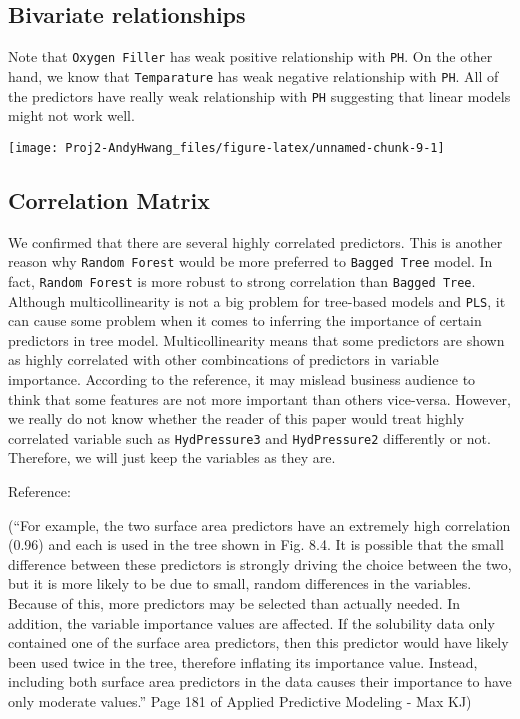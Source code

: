 \documentclass[]{report}
\begin{document}
\subsection{Bivariate relationships}\label{bivariate-relationships}

Note that \texttt{Oxygen\ Filler} has weak positive relationship with
\texttt{PH}. On the other hand, we know that \texttt{Temparature} has
weak negative relationship with \texttt{PH}. All of the predictors have
really weak relationship with \texttt{PH} suggesting that linear models
might not work well.

\begin{center}\texttt{[image: Proj2-AndyHwang\_files/figure-latex/unnamed-chunk-9-1]} \end{center}

\subsection{Correlation Matrix}\label{correlation-matrix}

We confirmed that there are several highly correlated predictors. This
is another reason why \texttt{Random\ Forest} would be more preferred to
\texttt{Bagged\ Tree} model. In fact, \texttt{Random\ Forest} is more
robust to strong correlation than \texttt{Bagged\ Tree}. Although
multicollinearity is not a big problem for tree-based models and
\texttt{PLS}, it can cause some problem when it comes to inferring the
importance of certain predictors in tree model. Multicollinearity means
that some predictors are shown as highly correlated with other
combincations of predictors in variable importance. According to the
reference, it may mislead business audience to think that some features
are not more important than others vice-versa. However, we really do not
know whether the reader of this paper would treat highly correlated
variable such as \texttt{HydPressure3} and \texttt{HydPressure2}
differently or not. Therefore, we will just keep the variables as they
are.

Reference:

(``For example, the two surface area predictors have an extremely high
correlation (0.96) and each is used in the tree shown in Fig. 8.4. It is
possible that the small difference between these predictors is strongly
driving the choice between the two, but it is more likely to be due to
small, random differences in the variables. Because of this, more
predictors may be selected than actually needed. In addition, the
variable importance values are affected. If the solubility data only
contained one of the surface area predictors, then this predictor would
have likely been used twice in the tree, therefore inflating its
importance value. Instead, including both surface area predictors in the
data causes their importance to have only moderate values.'' Page 181 of
Applied Predictive Modeling - Max KJ)
\end{document}
